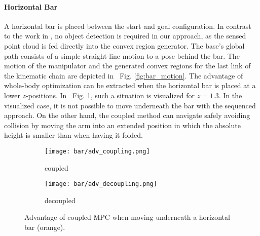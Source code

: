 \paragraph{Horizontal Bar}
\label{par:horizantal_bar}
%
A horizontal bar is placed between the start and goal configuration. In contrast to the work in \cite{Avanzini2018}, no object detection is required in our approach, as the sensed point cloud is fed directly into the convex region generator. The base's global path consists of a simple straight-line motion to a pose behind the bar. The motion of the manipulator and the generated convex regions for the last link of the kinematic chain are depicted in ~{Fig. \ref{fig:bar_motion}}. 
The advantage of whole-body optimization can be extracted when the horizontal bar is placed at a lower $z$-positions. In ~{Fig. \ref{fig:feasibility_issue}}, such a situation is visualized for $z=1.3$. In the visualized case, it is not possible to move underneath the bar with the sequenced approach. On the other hand, the coupled method can navigate safely avoiding collision by moving the arm into an extended position in which the absolute height is smaller than when having it folded.
%
\begin{figure}[ht]
    \centering
    \begin{subfigure}[b]{0.45\linewidth}
        \texttt{[image: bar/adv\_coupling.png]}
        \caption{coupled}
    \end{subfigure}
    \begin{subfigure}[b]{0.425\linewidth}
        \texttt{[image: bar/adv\_decoupling.png]}
        \caption{decoupled}
    \end{subfigure}
    \caption{Advantage of coupled MPC when moving underneath a horizontal bar (orange). }
    \label{fig:feasibility_issue}
\end{figure}
%
